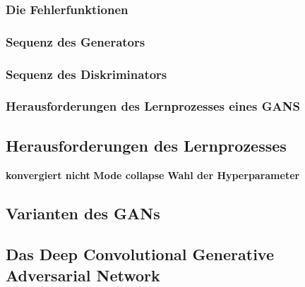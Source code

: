 	\subsubsection{Die Fehlerfunktionen} \label{loss-function}
	
	\subsubsection{Sequenz des Generators}
	
	\subsubsection{Sequenz des Diskriminators}
	
	\subsubsection{Herausforderungen des Lernprozesses eines GANS}

\subsection{Herausforderungen des Lernprozesses}
\textbf{konvergiert nicht}
\textbf{Mode collapse}
\textbf{Wahl der Hyperparameter}
\subsection{Varianten des GANs}
\subsection{Das Deep Convolutional Generative Adversarial Network}
